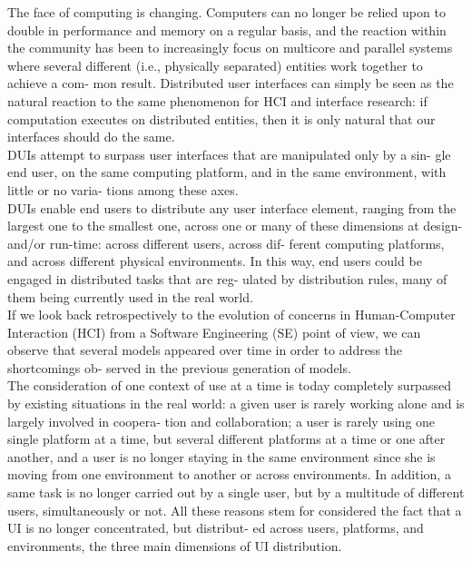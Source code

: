 \cite{elmqvist2011distributed}The face of computing is changing. Computers can
no longer be relied upon to double in performance and memory on a regular basis, and the reaction within the
community has been to increasingly focus on multicore and parallel systems where
several different (i.e., physically separated) entities work together to achieve
a com- mon result. Distributed user interfaces can simply be seen as the natural
reaction to the same phenomenon for HCI and interface research: if computation
executes on distributed entities, then it is only natural that our interfaces
should do the same. \\

\cite{vanderdonckt2010distributed} DUIs attempt to surpass user interfaces that
are manipulated only by a sin- gle end user, on the same computing platform, and
in the same environment, with little or no varia- tions among these axes.\\

\cite{vanderdonckt2010distributed} DUIs enable end users to distribute any user
interface element, ranging from the largest one to the smallest one, across one
or many of these dimensions at design- and/or run-time: across different users,
across dif- ferent computing platforms, and across different physical environments. In this way, end users could be engaged in distributed tasks that are reg- ulated by distribution rules, many of them being currently used in the real world. \\

\cite{vanderdonckt2010distributed} If we look back retrospectively to the
evolution of concerns in Human-Computer Interaction (HCI) from a Software
Engineering (SE) point of view, we can observe that several models appeared over
time in order to address the shortcomings ob- served in the previous generation of models.\\

\cite{vanderdonckt2010distributed}The consideration of one context of use at a
time is today completely surpassed by existing situations in the real world: a
given user is rarely working alone and is largely involved in coopera- tion and
collaboration; a user is rarely using one single platform at a time, but several different platforms at a time or one after another, and a user is no longer staying in the same environment since she is moving from one environment to another or across environments. In addition, a same task is no longer carried out by a single user, but by a multitude of different users, simultaneously or not. All these reasons stem for considered the fact that a UI is no longer concentrated, but distribut- ed across users, platforms, and environments, the three main dimensions of UI distribution.\\

